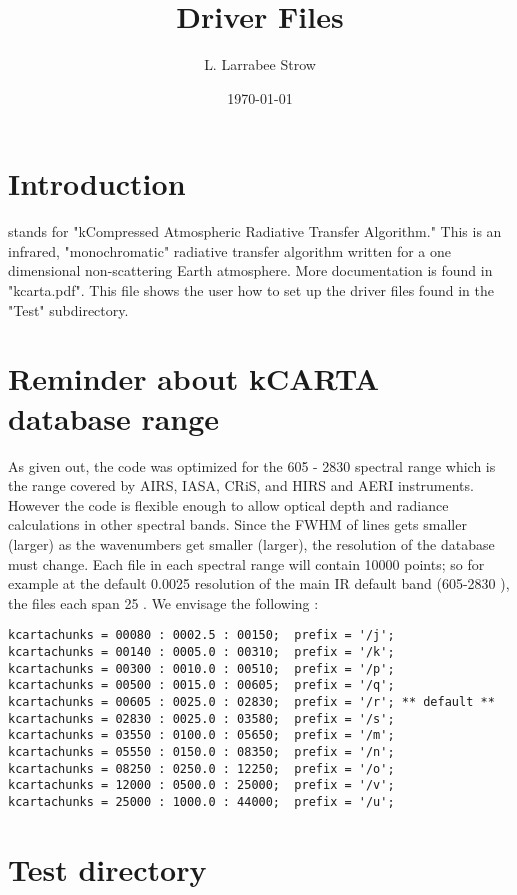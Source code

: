 \documentclass[11pt]{article}
\author{L. Larrabee Strow}
\date{\today}
\title{Driver Files}
\begin{document}
\maketitle
\tableofcontents


\section{Introduction}
\label{sec-1}

stands for "kCompressed Atmospheric Radiative Transfer Algorithm." This
is an infrared, "monochromatic" radiative transfer algorithm written for
a one dimensional non-scattering Earth atmosphere. More documentation is
found in "kcarta.pdf". This file shows the user how to set up the driver
files found in the "Test" subdirectory.

\section{Reminder about kCARTA database range}
\label{sec-2}

As given out, the code was optimized for the 605 - 2830 spectral range
which is the range covered by AIRS, IASA, CRiS, and HIRS and AERI
instruments. However the code is flexible enough to allow optical depth
and radiance calculations in other spectral bands. Since the FWHM of
lines gets smaller (larger) as the wavenumbers get smaller (larger), the
resolution of the database must change. Each file in each spectral range
will contain 10000 points; so for example at the default 0.0025
resolution of the main IR default band (605-2830 ), the files each span
25 . We envisage the following :

\begin{verbatim}
kcartachunks = 00080 : 0002.5 : 00150;  prefix = '/j';
kcartachunks = 00140 : 0005.0 : 00310;  prefix = '/k';
kcartachunks = 00300 : 0010.0 : 00510;  prefix = '/p';
kcartachunks = 00500 : 0015.0 : 00605;  prefix = '/q';
kcartachunks = 00605 : 0025.0 : 02830;  prefix = '/r'; ** default **
kcartachunks = 02830 : 0025.0 : 03580;  prefix = '/s';
kcartachunks = 03550 : 0100.0 : 05650;  prefix = '/m';
kcartachunks = 05550 : 0150.0 : 08350;  prefix = '/n';
kcartachunks = 08250 : 0250.0 : 12250;  prefix = '/o';
kcartachunks = 12000 : 0500.0 : 25000;  prefix = '/v';
kcartachunks = 25000 : 1000.0 : 44000;  prefix = '/u';
\end{verbatim}

\section{Test directory}
\label{sec-3}
\end{document}
